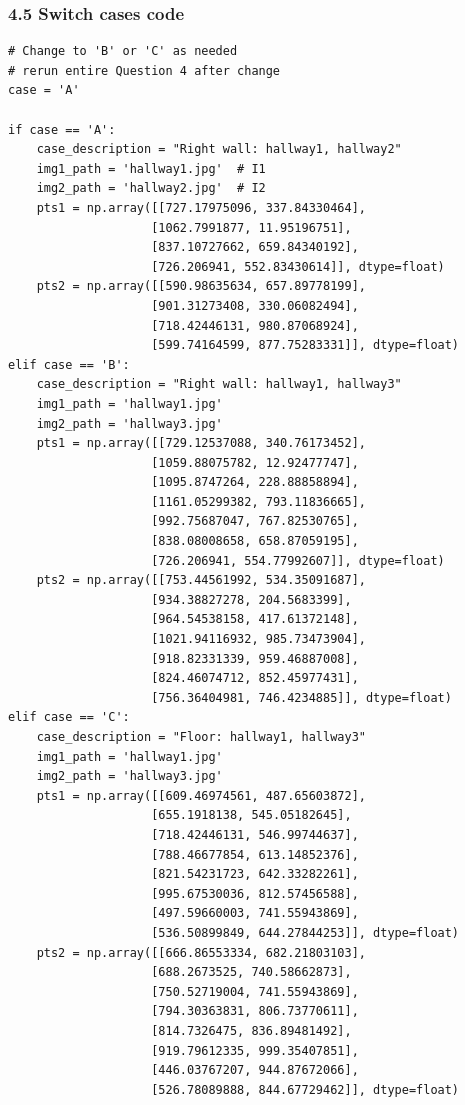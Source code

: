 \documentclass{article}
\begin{document}
\subsubsection*{4.5 Switch cases code}
\begin{lstlisting}
# Change to 'B' or 'C' as needed
# rerun entire Question 4 after change
case = 'A'  

if case == 'A':
    case_description = "Right wall: hallway1, hallway2"
    img1_path = 'hallway1.jpg'  # I1
    img2_path = 'hallway2.jpg'  # I2
    pts1 = np.array([[727.17975096, 337.84330464],
                    [1062.7991877, 11.95196751],
                    [837.10727662, 659.84340192],
                    [726.206941, 552.83430614]], dtype=float)
    pts2 = np.array([[590.98635634, 657.89778199],
                    [901.31273408, 330.06082494],
                    [718.42446131, 980.87068924],
                    [599.74164599, 877.75283331]], dtype=float)
elif case == 'B':
    case_description = "Right wall: hallway1, hallway3"
    img1_path = 'hallway1.jpg'
    img2_path = 'hallway3.jpg'
    pts1 = np.array([[729.12537088, 340.76173452],
                    [1059.88075782, 12.92477747],
                    [1095.8747264, 228.88858894],
                    [1161.05299382, 793.11836665],
                    [992.75687047, 767.82530765],
                    [838.08008658, 658.87059195],
                    [726.206941, 554.77992607]], dtype=float)
    pts2 = np.array([[753.44561992, 534.35091687],
                    [934.38827278, 204.5683399],
                    [964.54538158, 417.61372148],
                    [1021.94116932, 985.73473904],
                    [918.82331339, 959.46887008],
                    [824.46074712, 852.45977431],
                    [756.36404981, 746.4234885]], dtype=float)
elif case == 'C':
    case_description = "Floor: hallway1, hallway3"
    img1_path = 'hallway1.jpg'
    img2_path = 'hallway3.jpg'
    pts1 = np.array([[609.46974561, 487.65603872],
                    [655.1918138, 545.05182645],
                    [718.42446131, 546.99744637],
                    [788.46677854, 613.14852376],
                    [821.54231723, 642.33282261],
                    [995.67530036, 812.57456588],
                    [497.59660003, 741.55943869],
                    [536.50899849, 644.27844253]], dtype=float)
    pts2 = np.array([[666.86553334, 682.21803103],
                    [688.2673525, 740.58662873],
                    [750.52719004, 741.55943869],
                    [794.30363831, 806.73770611],
                    [814.7326475, 836.89481492],
                    [919.79612335, 999.35407851],
                    [446.03767207, 944.87672066],
                    [526.78089888, 844.67729462]], dtype=float)
\end{lstlisting}
\end{document}

